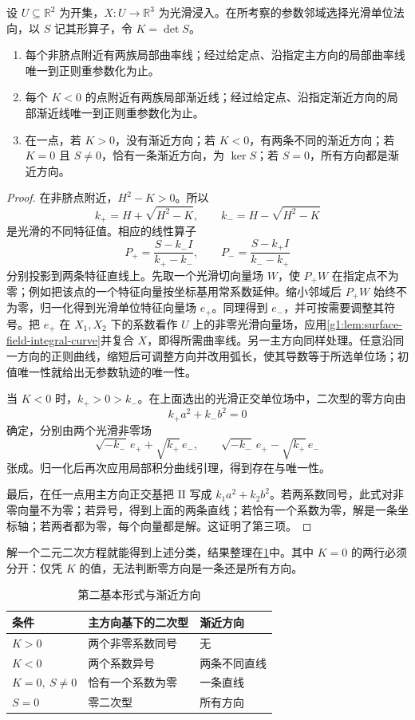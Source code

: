 \begin{proposition}\label{g1:prop:principal-asymptotic-lines}
	设 \(U\subseteq\mathbb R^2\) 为开集，\(X:U\to\mathbb R^3\) 为光滑浸入。在所考察的参数邻域选择光滑单位法向，以 \(S\) 记其形算子，令 \(K=\det S\)。
	\begin{enumerate}
		\item 每个非脐点附近有两族局部曲率线；经过给定点、沿指定主方向的局部曲率线唯一到正则重参数化为止。
		\item 每个 \(K<0\) 的点附近有两族局部渐近线；经过给定点、沿指定渐近方向的局部渐近线唯一到正则重参数化为止。
		\item 在一点，若 \(K>0\)，没有渐近方向；若 \(K<0\)，有两条不同的渐近方向；若 \(K=0\) 且 \(S\ne0\)，恰有一条渐近方向，为 \(\ker S\)；若 \(S=0\)，所有方向都是渐近方向。
	\end{enumerate}
\end{proposition}
\begin{proof}
	在非脐点附近，\(H^2-K>0\)。所以
	\[
		k_+=H+\sqrt{H^2-K},\qquad k_-=H-\sqrt{H^2-K}
	\]
	是光滑的不同特征值。相应的线性算子
	\[
		P_+=\frac{S-k_-I}{k_+-k_-},\qquad P_-=\frac{S-k_+I}{k_--k_+}
	\]
	分别投影到两条特征直线上。先取一个光滑切向量场 \(W\)，使 \(P_+W\) 在指定点不为零；例如把该点的一个特征向量按坐标基用常系数延伸。缩小邻域后 \(P_+W\) 始终不为零，归一化得到光滑单位特征向量场 \(e_+\)。同理得到 \(e_-\)，并可按需要调整其符号。把 \(e_+\) 在 \(X_1,X_2\) 下的系数看作 \(U\) 上的非零光滑向量场，应用\cref{g1:lem:surface-field-integral-curve}并复合 \(X\)，即得所需曲率线。另一主方向同样处理。任意沿同一方向的正则曲线，缩短后可调整方向并改用弧长，使其导数等于所选单位场；初值唯一性就给出无参数轨迹的唯一性。

	当 \(K<0\) 时，\(k_+>0>k_-\)。在上面选出的光滑正交单位场中，二次型的零方向由
	\[
		k_+a^2+k_-b^2=0
	\]
	确定，分别由两个光滑非零场
	\[
		\sqrt{-k_-}\,e_++\sqrt{k_+}\,e_-,
		\qquad
		\sqrt{-k_-}\,e_+-\sqrt{k_+}\,e_-
	\]
	张成。归一化后再次应用局部积分曲线引理，得到存在与唯一性。

	最后，在任一点用主方向正交基把 \(\mathrm{II}\) 写成 \(k_1a^2+k_2b^2\)。若两系数同号，此式对非零向量不为零；若异号，得到上面的两条直线；若恰有一个系数为零，解是一条坐标轴；若两者都为零，每个向量都是解。这证明了第三项。
\end{proof}

解一个二元二次方程就能得到上述分类，结果整理在\cref{g1:tab:asymptotic-directions}中。其中 \(K=0\) 的两行必须分开：仅凭 \(K\) 的值，无法判断零方向是一条还是所有方向。

\begin{table}[htbp]
	\centering
	\caption{第二基本形式与渐近方向}
	\label{g1:tab:asymptotic-directions}
	\begin{tabular}{lll}
		\toprule
		条件 & 主方向基下的二次型 & 渐近方向 \\
		\midrule
		\(K>0\) & 两个非零系数同号 & 无 \\
		\(K<0\) & 两个系数异号 & 两条不同直线 \\
		\(K=0,\ S\ne0\) & 恰有一个系数为零 & 一条直线 \\
		\(S=0\) & 零二次型 & 所有方向 \\
		\bottomrule
	\end{tabular}
\end{table}

